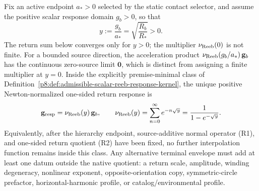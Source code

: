\documentclass[12pt,a4paper]{article}
\begin{document}
\begin{theorem}
\label{p8:thm:geometry-forced-compact-reeb-envelope}
Fix an active endpoint \(a_*>0\) selected by the static contact selector,
and assume the positive scalar response domain \(g_b>0\), so that
\begin{equation}
\label{p8:eq:forced-reeb-y-coordinate}
    y:=\frac{g_b}{a_*}
    =\sqrt{\frac{R_b}{R_*}}>0 .
\end{equation}
The return sum below converges only for \(y>0\); the multiplier
\(\nu_{\rm Reeb}(0)\) is not finite. For a bounded source direction,
the acceleration product \(\nu_{\rm Reeb}(g_b/a_*)\,\mathbf g_b\)
has the continuous zero-source limit \(\mathbf 0\), which is distinct
from assigning a finite multiplier at \(y=0\).
Inside the explicitly premise-minimal class of Definition~\ref{p8:def:admissible-scalar-reeb-response-kernel}, the unique positive Newton-normalized one-sided return response is
\begin{equation}
\label{p8:eq:forced-compact-reeb-response}
    \mathbf g_{\rm resp}
    =
    \nu_{\rm Reeb}(y)\,\mathbf g_b,
    \qquad
    \nu_{\rm Reeb}(y)
    =
    \sum_{n=0}^{\infty}e^{-n\sqrt y}
    =
    \frac{1}{1-e^{-\sqrt y}} .
\end{equation}
Equivalently, after the hierarchy endpoint, source-additive normal operator (R1), and one-sided return quotient (R2) have been fixed, no further interpolation function remains inside this class.  Any alternative terminal envelope must add at least one datum outside the native quotient: a return scale, amplitude, winding degeneracy, nonlinear exponent, opposite-orientation copy, symmetric-circle prefactor, horizontal-harmonic profile, or catalog/environmental profile.
\end{theorem}
\end{document}
